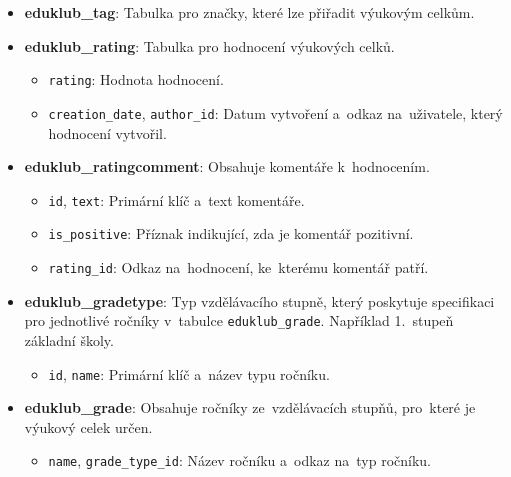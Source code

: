 \documentclass[male,czech,api_bc]{kitheses}
\begin{document}
\begin{itemize}
	\item \textbf{eduklub\_tag}: Tabulka pro značky, které lze přiřadit výukovým celkům.
	
	\item \textbf{eduklub\_rating}: Tabulka pro hodnocení výukových celků.
	\begin{itemize}
		\item \texttt{rating}: Hodnota hodnocení.
		\item \texttt{creation\_date}, \texttt{author\_id}: Datum vytvoření a~odkaz na~uživatele, který hodnocení vytvořil.
	\end{itemize}
	
	\item \textbf{eduklub\_ratingcomment}: Obsahuje komentáře k~hodnocením.
	\begin{itemize}
		\item \texttt{id}, \texttt{text}: Primární klíč a~text komentáře.
		\item \texttt{is\_positive}: Příznak indikující, zda je komentář pozitivní.
		\item \texttt{rating\_id}: Odkaz na~hodnocení, ke~kterému komentář patří.
	\end{itemize}
	
	\item \textbf{eduklub\_gradetype}: Typ vzdělávacího stupně, který poskytuje specifikaci pro jednotlivé ročníky v~tabulce \texttt{eduklub\_grade}. Například 1.~stupeň základní školy.
	\begin{itemize}
		\item \texttt{id}, \texttt{name}: Primární klíč a~název typu ročníku.
	\end{itemize}
	
	\item \textbf{eduklub\_grade}: Obsahuje ročníky ze~vzdělávacích stupňů, pro~které je výukový celek určen.
	\begin{itemize}
		\item \texttt{name}, \texttt{grade\_type\_id}: Název ročníku a~odkaz na~typ ročníku.
	\end{itemize}
\end{itemize}
\end{document}
